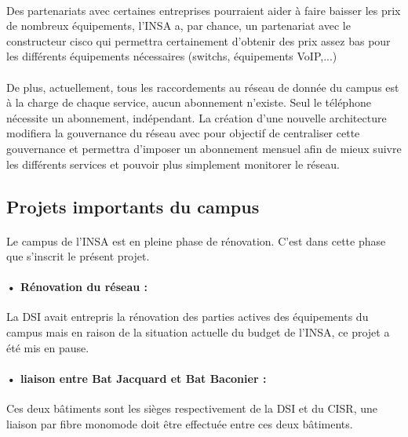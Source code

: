 \paragraph{} Des partenariats avec certaines entreprises pourraient aider à faire baisser les prix de nombreux équipements, l'INSA a, par chance, un partenariat avec le constructeur cisco qui permettra certainement d'obtenir des prix assez bas pour les différents équipements nécessaires (switchs, équipements VoIP,...)

\paragraph{} De plus, actuellement, tous les raccordements au réseau de donnée du campus est à la charge de chaque service, aucun abonnement n'existe. Seul le téléphone nécessite un abonnement, indépendant. La création d'une nouvelle architecture modifiera la gouvernance du réseau avec pour objectif de centraliser cette gouvernance et permettra d'imposer un abonnement mensuel afin de mieux suivre les différents services et pouvoir plus simplement monitorer le réseau.






\subsection{Projets importants du campus}

\paragraph{} Le campus de l'INSA est en pleine phase de rénovation. C'est dans cette phase que s'inscrit le présent projet.

\paragraph{• Rénovation du réseau :} La DSI avait entrepris la rénovation des parties actives des équipements du campus mais en raison de la situation actuelle du budget de l'INSA, ce projet a été mis en pause.

\paragraph{• liaison entre Bat Jacquard et Bat Baconier :} Ces deux bâtiments sont les sièges respectivement de la DSI et du CISR, une liaison par fibre monomode doit être effectuée entre ces deux bâtiments.

